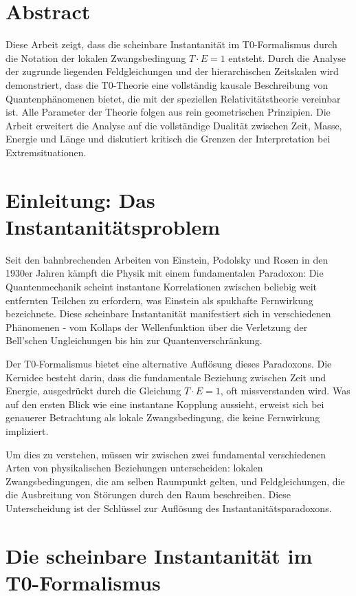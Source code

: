 \section*{Abstract}
		Diese Arbeit zeigt, dass die scheinbare Instantanität im T0-Formalismus durch die Notation der lokalen Zwangsbedingung $T \cdot E = 1$ entsteht. Durch die Analyse der zugrunde liegenden Feldgleichungen und der hierarchischen Zeitskalen wird demonstriert, dass die T0-Theorie eine vollständig kausale Beschreibung von Quantenphänomenen bietet, die mit der speziellen Relativitätstheorie vereinbar ist. Alle Parameter der Theorie folgen aus rein geometrischen Prinzipien. Die Arbeit erweitert die Analyse auf die vollständige Dualität zwischen Zeit, Masse, Energie und Länge und diskutiert kritisch die Grenzen der Interpretation bei Extremsituationen.

	
	\hypersetup{linkcolor=blue}
	
	\section{Einleitung: Das Instantanitätsproblem}
	
	Seit den bahnbrechenden Arbeiten von Einstein, Podolsky und Rosen in den 1930er Jahren kämpft die Physik mit einem fundamentalen Paradoxon: Die Quantenmechanik scheint instantane Korrelationen zwischen beliebig weit entfernten Teilchen zu erfordern, was Einstein als spukhafte Fernwirkung bezeichnete. Diese scheinbare Instantanität manifestiert sich in verschiedenen Phänomenen - vom Kollaps der Wellenfunktion über die Verletzung der Bell'schen Ungleichungen bis hin zur Quantenverschränkung.
	
	Der T0-Formalismus bietet eine alternative Auflösung dieses Paradoxons. Die Kernidee besteht darin, dass die fundamentale Beziehung zwischen Zeit und Energie, ausgedrückt durch die Gleichung $T \cdot E = 1$, oft missverstanden wird. Was auf den ersten Blick wie eine instantane Kopplung aussieht, erweist sich bei genauerer Betrachtung als lokale Zwangsbedingung, die keine Fernwirkung impliziert.
	
	Um dies zu verstehen, müssen wir zwischen zwei fundamental verschiedenen Arten von physikalischen Beziehungen unterscheiden: lokalen Zwangsbedingungen, die am selben Raumpunkt gelten, und Feldgleichungen, die die Ausbreitung von Störungen durch den Raum beschreiben. Diese Unterscheidung ist der Schlüssel zur Auflösung des Instantanitätsparadoxons.
	
	\section{Die scheinbare Instantanität im T0-Formalismus}
	

